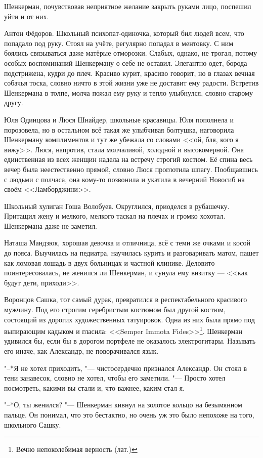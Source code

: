Шенкерман, почувствовав неприятное желание закрыть руками лицо, поспешил уйти и от них.

Антон Фёдоров.
Школьный психопат-одиночка, который бил людей всем, что попадало под руку.
Стоял на учёте, регулярно попадал в ментовку.
С ним боялись связываться даже матёрые отморозки.
Слабых, однако, не трогал, потому особых воспоминаний Шенкерману о себе не оставил.
Элегантно одет, борода подстрижена, кудри до плеч.
Красиво курит, красиво говорит, но в глазах вечная собачья тоска, словно ничто в этой жизни уже не доставит ему радости.
Встретив Шенкермана в толпе, молча пожал ему руку и тепло улыбнулся, словно старому другу.

Юля Одинцова и Люся Шнайдер, школьные красавицы.
Юля пополнела и порозовела, но в остальном всё такая же улыбчивая болтушка, наговорила Шенкерману комплиментов и тут же убежала со словами <<ой, бля, кого я вижу>>.
Люся, напротив, стала молчаливой, холодной и высокомерной.
Она единственная из всех женщин надела на встречу строгий костюм.
Её спина весь вечер была неестественно прямой, словно Люся проглотила шпагу.
Пообщавшись с людьми с полчаса, она кому-то позвонила и укатила в вечерний Новосиб на своём <<Ламборджини>>.

Школьный хулиган Гоша Волобуев.
Округлился, приоделся в рубашечку.
Притащил жену и мелкого, мелкого таскал на плечах и громко хохотал.
Шенкермана даже не заметил.

Наташа Мандзюк, хорошая девочка и отличница, всё с теми же очками и косой до пояса.
Выучилась на педиатра, научилась курить и разговаривать матом, пашет как ломовая лошадь в двух больницах и частной клинике.
Деловито поинтересовалась, не женился ли Шенкерман, и сунула ему визитку --- <<как будут дети, приходи>>.

Воронцов Сашка, тот самый дурак, превратился в респектабельного красивого мужчину.
Под его строгим серебристым костюмом был другой костюм, состоящий из дорогих художественных татуировок.
Одна из них была прямо под выпирающим кадыком и гласила: <<Semper Immota Fides>>\footnote{Вечно непоколебимая верность (лат.)}.
Шенкерман удивился бы, если бы в дорогом портфеле не оказалось электрогитары.
Называть его иначе, как Александр, не поворачивался язык.

"--*Я не хотел приходить, "--- чистосердечно признался Александр.
Он стоял в тени занавесок, словно не хотел, чтобы его заметили.
"--- Просто хотел посмотреть, какими вы стали и, что важнее, каким стал я.

"--*О, ты женился? "--- Шенкерман кивнул на золотое кольцо на безымянном пальце.
Он понимал, что это бестактно, но очень уж это было непохоже на того, школьного Сашку.


